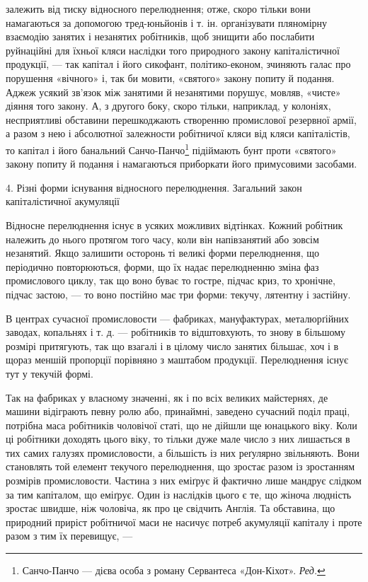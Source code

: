 залежить від тиску відносного перелюднення; отже, скоро тільки вони намагаються за допомогою
тред-юньйонів і т. ін. організувати пляномірну взаємодію занятих і незанятих робітників, щоб знищити
або послабити руйнаційні для їхньої кляси наслідки того природного закону капіталістичної продукції,
— так капітал і його сикофант, політико-економ, зчиняють галас про порушення «вічного» і, так би
мовити, «святого» закону попиту й подання. Аджеж усякий зв’язок між занятими й незанятими
порушує, мовляв, «чисте» діяння того закону. А, з другого боку, скоро тільки, наприклад, у колоніях,
несприятливі обставини перешкоджають створенню промислової резервної армії, а разом з нею і
абсолютної залежности робітничої кляси від кляси капіталістів, то капітал і його банальний
Санчо-Панчо\footnote*{
Санчо-Панчо — дієва особа з роману Сервантеса «Дон-Кіхот». \emph{Ред.}
} підіймають
бунт проти «святого» закону попиту й подання і намагаються приборкати його примусовими засобами.

4. Різні форми існування відносного перелюднення. Загальний закон капіталістичної акумуляції

Відносне перелюднення існує в усяких можливих відтінках. Кожний робітник належить до нього протягом
того часу, коли він напівзанятий або зовсім незанятий. Якщо залишити осторонь ті великі форми
перелюднення, що періодично повторюються,
форми, що їх надає перелюдненню зміна фаз промислового циклу, так що воно буває то гостре, підчас
криз, то хронічне, підчас застою, — то воно постійно має три форми: текучу, лятентну і застійну.

В центрах сучасної промисловости — фабриках, мануфактурах, металюрґійних заводах, копальнях і т. д.
— робітників то відштовхують, то знову в більшому розмірі притягують, так що взагалі і в цілому
число занятих більшає, хоч і в щораз
меншій пропорції порівняно з маштабом продукції. Перелюднення існує тут у текучій формі.

Так на фабриках у власному значенні, як і по всіх великих майстернях, де машини відіграють певну
ролю або, принаймні, заведено сучасний поділ праці, потрібна маса робітників чоловічої статі, що не
дійшли ще юнацького віку. Коли ці робітники доходять цього віку, то тільки дуже мале число з них
лишається в тих самих галузях промисловости, а більшість із них реґулярно звільняють. Вони
становлять той елемент текучого перелюднення, що зростає разом із зростанням розмірів промисловости.
Частина з них еміґрує й фактично лише мандрує слідком за тим капіталом, що еміґрує. Один із
наслідків цього є те, що жіноча людність зростає швидше, ніж чоловіча, як про це свідчить Англія. Та
обставина, що природний приріст робітничої маси не насичує
потреб акумуляції капіталу і проте разом з тим їх перевищує, —